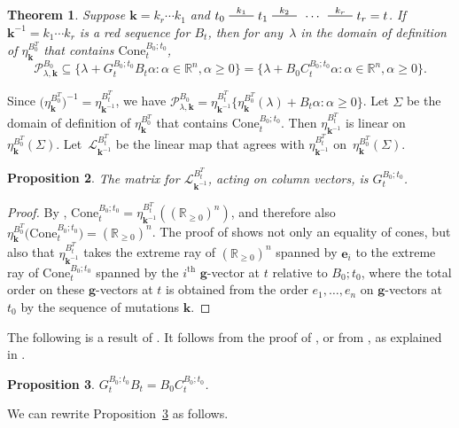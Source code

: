 \documentclass{amsart}
\newtheorem{proposition}{Proposition}[section]
\newtheorem{theorem}[proposition]{Theorem}
\theoremstyle{definition}
\theoremstyle{remark}
\numberwithin{equation}{section}
\newcommand{\reals}{\mathbb R}
\newcommand{\edge}{\,\,\rule[2.7pt]{20pt}{0.5pt}\,\,}
\newcommand{\set}[1]{{\lbrace #1 \rbrace}}
\newcommand{\sett}[1]{{\bigl\lbrace #1 \bigr\rbrace}}
\renewcommand{\th}{^\text{th}}
\newcommand{\0}{{\mathbf{0}}}
\newcommand{\Cone}{\mathrm{Cone}}
\newcommand{\g}{\mathbf{g}}
\newcommand{\kk}{{\boldsymbol{k}}}
\newcommand{\e}{\mathbf{e}}
\renewcommand{\L}{\mathcal{L}}
\renewcommand{\P}{\mathcal{P}}
\renewcommand{\th}{^\text{th}}
\begin{document}
\begin{theorem}\label{P in B0C}
Suppose $\kk=k_r\cdots k_1$ and $t_0\overset{k_1}{\edge}t_1\overset{k_2}{\edge}\,\cdots\,\overset{k_r}{\edge}t_r=t$.
If $\kk^{-1}=k_1\cdots k_r$ is a red sequence for $B_t$, then for any~$\lambda$ in the domain of definition of $\eta_\kk^{B_0^T}$ that contains $\Cone^{B_0;t_0}_t$,
\[\P^{B_0}_{\lambda,\kk}\subseteq\set{\lambda+G_t^{B_0;t_0}B_t\alpha:\alpha\in\reals^n,\alpha\ge0}=\set{\lambda+B_0C_t^{B_0;t_0}\alpha:\alpha\in\reals^n,\alpha\ge0}.\]
\end{theorem}

Since $\bigl(\eta_{\kk}^{B_0^T}\bigr)^{-1}=\eta_{\kk^{-1}}^{B_t^T}$, we have $\P^{B_0}_{\lambda,\kk}=\eta_{\kk^{-1}}^{B_t^T}\sett{\eta_\kk^{B_0^T}(\lambda)+B_t\alpha:\alpha\ge0}$.
Let $\Sigma$ be the domain of definition of $\eta_{\kk}^{B_0^T}$  that contains $\Cone^{B_0;t_0}_t$.
Then $\eta_{\kk^{-1}}^{B_t^T}$ is linear on $\eta_{\kk}^{B_0^T}(\Sigma)$.
Let~$\L_{\kk^{-1}}^{B_t^T}$ be the linear map that agrees with $\eta_{\kk^{-1}}^{B_t^T}$ on~$\eta_{\kk}^{B_0^T}(\Sigma)$.

\begin{proposition}\label{L mat}
The matrix for $\L_{\kk^{-1}}^{B_t^T}$, acting on column vectors, is $G_t^{B_0;t_0}$.
\end{proposition}
\begin{proof}
By \cite[Proposition~8.13]{universal}, $\Cone^{B_0;t_0}_t=\eta_{\kk^{-1}}^{B_t^T}\left(\left(\reals_{\ge0}\right)^n\right)$, and therefore also ${\eta_\kk^{B_0^T}\bigl(\Cone^{B_0;t_0}_t\bigr)=\left(\reals_{\ge0}\right)^n}$.
The proof of \cite[Proposition~8.13]{universal} shows not only an equality of cones, but also that $\eta_{\kk^{-1}}^{B_t^T}$ takes the extreme ray of $\left(\reals_{\ge0}\right)^n$ spanned by $\e_i$ to the extreme ray of $\Cone^{B_0;t_0}_t$ spanned by the $i\th$ $\g$-vector at $t$ relative to $B_0;t_0$, where the total order on these $\g$-vectors at $t$ is obtained from the order $e_1,\ldots,e_n$ on $\g$-vectors at $t_0$ by the sequence of mutations $\kk$.
\end{proof}

The following is a result of \cite{NZ}.
It follows from the proof of \cite[Proposition~1.3]{NZ}, or from \cite[(6.14)]{ca4}, as explained in \cite[Remark~2.1]{NZ}.

\begin{proposition}\label{GBBC}
$G_t^{B_0;t_0}B_t=B_0C_t^{B_0;t_0}$.
\end{proposition}

We can rewrite Proposition~\ref{GBBC} as follows.
\end{document}
